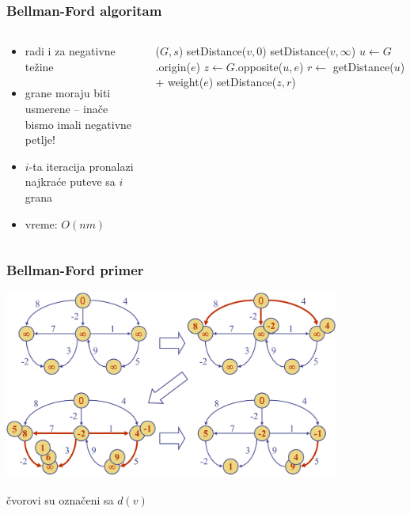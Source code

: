 \documentclass[compress,aspectratio=169]{beamer}
\begin{document}
\begin{frame}[fragile,shrink=2]
  \frametitle{Bellman-Ford algoritam}
  \begin{columns}
    \begin{column}[t]{7cm}
      \begin{itemize}
        \item radi i za negativne težine
        \item grane moraju biti usmerene -- inače bismo imali negativne 
          petlje!
        \item $i$-ta iteracija pronalazi najkraće puteve sa $i$ grana
        \item vreme: $O(nm)$
      \end{itemize}
    \end{column}
    \begin{column}[t]{7cm}
      \begin{algorithmic}
        \STATE {}($G,s$)
            \STATE setDistance($v,0$)
          \ELSE
            \STATE setDistance($v,\infty$)
          \ENDIF
        \ENDFOR
            \STATE {}
            \STATE $u \leftarrow G$.origin($e$)
            \STATE $z \leftarrow G$.opposite($u,e$)
            \STATE $r \leftarrow$ getDistance($u$) + weight($e$)
              \STATE setDistance($z,r$)
            \ENDIF
          \ENDFOR
        \ENDFOR
      \end{algorithmic}
    \end{column}
  \end{columns}
\end{frame}

\begin{frame}[fragile]
  \frametitle{Bellman-Ford primer}
  \begin{center}
    \includegraphics[width=11cm]{asp-14-pic66.png}
  \end{center}
  \hfill {\scriptsize čvorovi su označeni sa $d(v)$}
\end{frame}
\end{document}
